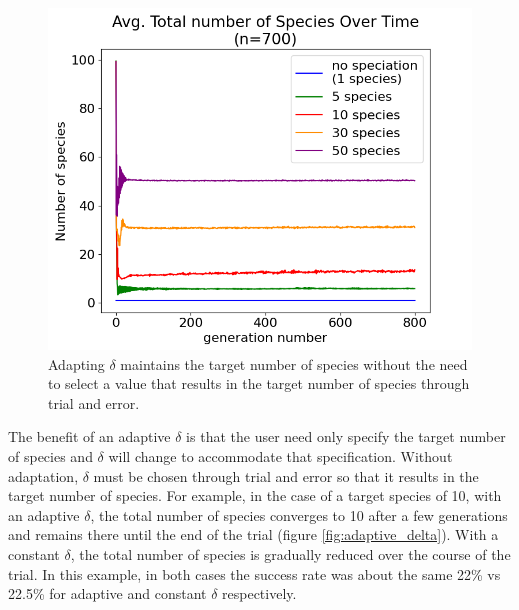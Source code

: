 \documentclass[12pt]{report}
\begin{document}
\begin{figure}
\centering
    \includegraphics[width=15cm]{images/avg_num_species.png}
    \caption[Average total number of species over time]{Adapting $\delta$ maintains the target number of species without the need to select a value that results in the target number of species through trial and error.}
    \label{fig:avg_num_species}
\end{figure}

The benefit of an adaptive $\delta$ is that the user need only specify the target number of species and $\delta$ will change to accommodate that specification. Without adaptation, $\delta$ must be chosen through trial and error so that it results in the target number of species. For example, in the case of a target species of 10, with an adaptive $\delta$, the total number of species converges to 10 after a few generations and remains there until the end of the trial (figure \ref{fig:adaptive_delta}). With a constant $\delta$, the total number of species is gradually reduced over the course of the trial. In this example, in both cases the success rate was about the same 22\% vs 22.5\% for adaptive and constant $\delta$ respectively. 
\end{document}
